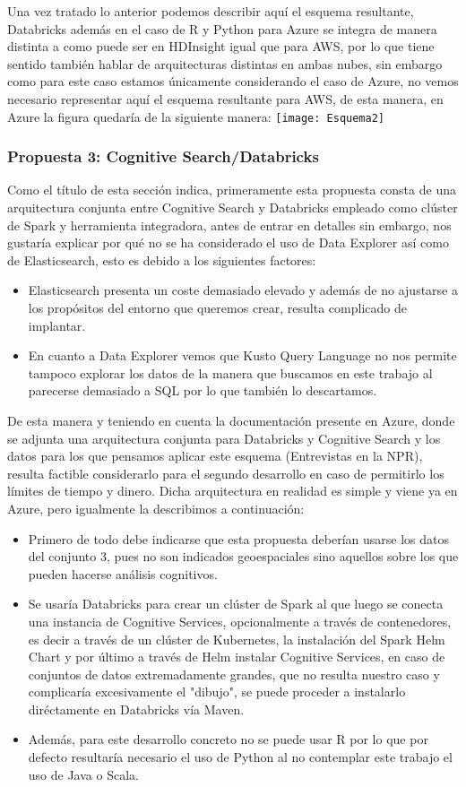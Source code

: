 \documentclass[11pt, a4paper]{article} %
\begin{document}
Una vez tratado lo anterior podemos describir aquí el esquema resultante,  Databricks además en el caso de R y Python para Azure se integra de manera distinta a como puede ser en HDInsight igual que para AWS, por lo que tiene sentido también hablar de arquitecturas distintas en ambas nubes, sin embargo como para este caso estamos únicamente considerando el caso de Azure, no vemos necesario representar aquí el esquema resultante para AWS, de esta manera, en Azure la figura quedaría de la siguiente manera:
\texttt{[image: Esquema2]}


\subsubsection{Propuesta 3: Cognitive Search/Databricks}
Como el título de esta sección indica, primeramente esta propuesta consta de una arquitectura conjunta entre Cognitive Search y Databricks empleado como clúster de Spark y herramienta integradora, antes de entrar en detalles sin embargo, nos gustaría explicar por qué no se ha considerado el uso de Data Explorer así como de Elasticsearch, esto es debido a los siguientes factores:
\begin{itemize}
\item Elasticsearch presenta un coste demasiado elevado y además de no ajustarse a los propósitos del entorno que queremos crear, resulta complicado de implantar.
\item En cuanto a Data Explorer vemos que Kusto Query Language no nos permite tampoco explorar los datos de la manera que buscamos en este trabajo al parecerse demasiado a SQL por lo que también lo descartamos.
\end{itemize}
De esta manera y teniendo en cuenta la documentación presente en Azure, donde se adjunta una arquitectura conjunta para Databricks y Cognitive Search y los datos para los que pensamos aplicar este esquema (Entrevistas en la NPR), resulta factible considerarlo para el segundo desarrollo en caso de permitirlo los límites de tiempo y dinero. Dicha arquitectura en realidad es simple y viene ya en Azure, pero igualmente la describimos a continuación: 
\begin{itemize}
\item Primero de todo debe indicarse que esta propuesta deberían usarse los datos del conjunto 3, pues no son indicados geoespaciales sino aquellos sobre los que pueden hacerse análisis cognitivos.
\item Se usaría Databricks para crear un clúster de Spark al que luego se conecta una instancia de Cognitive Services, opcionalmente a través de contenedores, es decir a través de un clúster de Kubernetes, la instalación del Spark Helm Chart y por último a través de Helm instalar Cognitive Services, en caso de conjuntos de datos extremadamente grandes, que no resulta nuestro caso y complicaría excesivamente el "dibujo", se puede proceder a instalarlo diréctamente en Databricks vía Maven.
\item Además, para este desarrollo concreto no se puede usar R por lo que por defecto resultaría necesario el uso de Python al no contemplar este trabajo el uso de Java o Scala.
\end{itemize}
\end{document}
